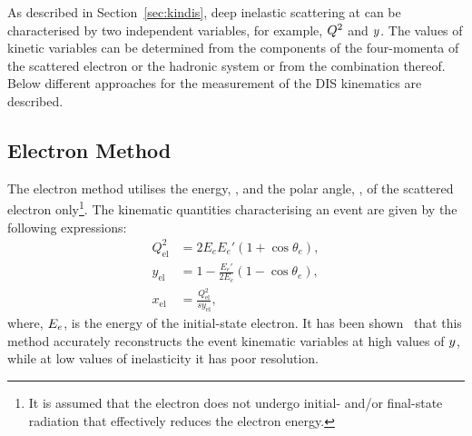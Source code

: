 As described in Section~\ref{sec:kindis}, deep inelastic scattering at \hera can be characterised by two independent variables, for example, $\mbox{${Q^2}$}$ and $\mbox{${y}$}$. The values of kinetic variables can be determined from the components of the four-momenta of the scattered electron or the hadronic system or from the combination thereof. Below different approaches for the measurement of the DIS kinematics are described.
\subsection{Electron Method}
\label{subsec:em}
The electron method utilises the energy, \eefin, and the polar angle, \thetae, of the scattered electron only\footnote{It is assumed that the electron does not undergo initial- and/or final-state radiation that effectively reduces the electron energy.}. The kinematic quantities characterising an event are given by the following expressions:
\begin{align}
	Q^2_\text{el} &= 2 E_e E_e' \left( 1 + \cos \theta_e \right),			\label{eq:q2el}							\\
	y_\text{el}      &= 1 - \frac{E_e'}{2 E_e}\left( 1 - \cos \theta_e \right),			\label{eq:yel} \\
	x_\text{el}      &= \frac{Q^2_\text{el}}{s y_\text{el}},			\label{eq:xel}
\end{align}
where, $\mbox{$E_e$}$, is the energy of the initial-state electron. It has been shown~\cite{nim:a426:583} that this method accurately reconstructs the event kinematic variables at high values of $\mbox{${y}$}$, while at low values of inelasticity it has poor resolution.
